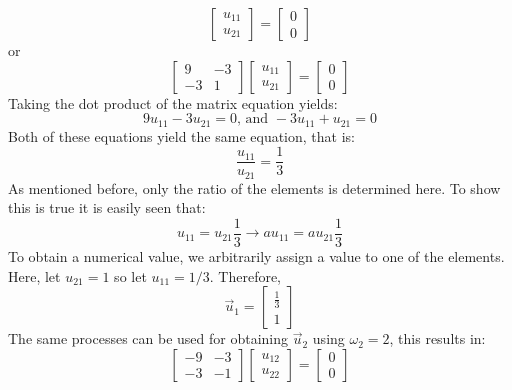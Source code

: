 \documentclass[12pt,letter]{article}
\begin{document}
\begin{example}
\begin{equation}
		 \begin{bmatrix} u_{11}\\ u_{21}\end{bmatrix}=\begin{bmatrix} 0\\ 0\end{bmatrix}
	\end{equation}
	or
	\begin{equation}
		 \begin{bmatrix} 9 & -3 \\    -3  & 1 \end{bmatrix} 
		 \begin{bmatrix} u_{11}\\ u_{21}\end{bmatrix}=\begin{bmatrix} 0\\ 0\end{bmatrix}
	\end{equation}
	Taking the dot product of the matrix equation yields:
	\begin{equation}
		9u_{11} -3u_{21}=0 \text{, and } -3u_{11} + u_{21}=0
	\end{equation}
	Both of these equations yield the same equation, that is:
	\begin{equation}
		\frac{u_{11}}{u_{21}} =\frac{1}{3}
	\end{equation}
	As mentioned before, only the ratio of the elements is determined here. To show this is true it is easily seen that:
	\begin{equation}
		u_{11}=u_{21}\frac{1}{3} \rightarrow  a u_{11}= a u_{21}\frac{1}{3} 
	\end{equation}
	To obtain a numerical value, we arbitrarily assign a value to one of the elements. Here, let $u_{21}=1$ so  let $u_{11}=1/3$. Therefore, 
	\begin{equation}
		 \vec{u}_1 = \begin{bmatrix} \frac{1}{3}\\ 1\end{bmatrix}
	\end{equation}
	The same processes can be used for obtaining $\vec{u}_2$ using $\omega_2=2$, this results in:
	\begin{equation}
		 \begin{bmatrix} -9 & -3 \\    -3  & -1 \end{bmatrix} 
		 \begin{bmatrix} u_{12}\\ u_{22}\end{bmatrix}=\begin{bmatrix} 0\\ 0\end{bmatrix}

\end{equation}
\end{example}
\end{document}
